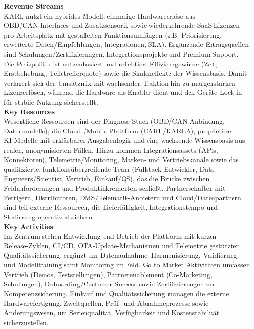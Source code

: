 \textbf{Revenue Streams} \\
\ac{KARL} nutzt ein hybrides Modell: einmalige Hardwareerlöse aus \ac{OBD}/\ac{CAN}‑Interfaces und Zusatzsensorik sowie wiederkehrende \ac{SaaS}‑Lizenzen pro Arbeitsplatz mit gestaffelten Funktionsumfängen (z.B. Priorisierung, erweiterte Daten/Empfehlungen, Integrationen, \ac{SLA}). Ergänzende Ertragsquellen sind Schulungen/Zertifizierungen, Integrationsprojekte und Premium‑Support. Die Preispolitik ist nutzenbasiert und reflektiert Effizienzgewinne (Zeit, Erstbehebung, Teiletrefferquote) sowie die Skaleneffekte der Wissensbasis. Damit verlagert sich der Umsatzmix mit wachsender Traktion hin zu margenstarken Lizenzerlösen, während die Hardware als Enabler dient und den Geräte‑Lock‑in für stabile Nutzung sicherstellt. \\

\textbf{Key Resources} \\
Wesentliche Ressourcen sind der Diagnose‑Stack (\ac{OBD}/\ac{CAN}‑Anbindung, Datenmodelle), die Cloud‑/Mobile‑Plattform (\ac{CARL}/\ac{KARLA}), proprietäre \ac{KI}‑Modelle mit erklärbarer Ausgabenlogik und eine wachsende Wissensbasis aus realen, anonymisierten Fällen. Hinzu kommen Integrationsassets (APIs, Konnektoren), Telemetrie/Monitoring, Marken‑ und Vertriebskanäle sowie das qualifizierte, funktionsübergreifende Team (Fullstack‑Entwickler, Data Engineers/Scientist, Vertrieb, Einkauf/QS), das die Brücke zwischen Feldanforderungen und Produktinkrementen schließt. Partnerschaften mit Fertigern, Distributoren, \ac{DMS}/Telematik‑Anbietern und Cloud/Datenpartnern sind teil‑externe Ressourcen, die Lieferfähigkeit, Integrationstempo und Skalierung operativ absichern. \\

\textbf{Key Activities}\\
Im Zentrum stehen Entwicklung und Betrieb der Plattform mit kurzen Release‑Zyklen, \ac{CI/CD}, \ac{OTA}‑Update‑Mechanismen und Telemetrie gestützter Qualitätssicherung, ergänzt um Datenaufnahme, Harmonisierung, Validierung und Modelltraining samt Monitoring im Feld. Go to Market   Aktivitäten umfassen Vertrieb (Demos, Teststellungen), Partnerenablement (Co‑Marketing, Schulungen), Onboarding/Customer Success sowie Zertifizierungen zur Kompetenzsicherung. Einkauf und Qualitätssicherung managen die externe Hardwarefertigung, Zweitquellen, Prüf- und Abnahmeprozesse sowie Änderungswesen, um Serienqualität, Verfügbarkeit und Kostenstabilität sicherzustellen. \\

